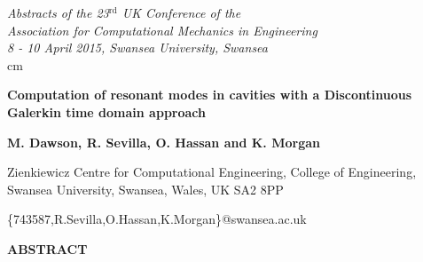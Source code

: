 \documentclass[times,11pt]{ACME2015article}
\begin{document}
\pagestyle{empty}

\begin{flushright}
{\fontsize{8}{10}
\it Abstracts of the 23$^\mathrm{rd}$ UK Conference of the\\
Association for Computational Mechanics in Engineering\\
8 - 10 April 2015, Swansea University, Swansea\\}  cm
\end{flushright}

\begin{center}
{\fontsize{14}{20}\bf Computation of resonant modes in cavities with a Discontinuous Galerkin time domain approach
%
%
}\end{center}


\begin{center}
\textbf{M. Dawson, R. Sevilla, O. Hassan and K. Morgan}\\
\end{center}

\begin{center}
{\fontsize{10}{12}
Zienkiewicz Centre for Computational Engineering, College of Engineering, Swansea University, Swansea, Wales, UK SA2 8PP\\
}\end{center}

\begin{center}
\{743587,R.Sevilla,O.Hassan,K.Morgan\}@swansea.ac.uk\\
\end{center}
%
\begin{center}
\textbf{ABSTRACT}\\[1mm]
\end{center}
%
\end{document}
